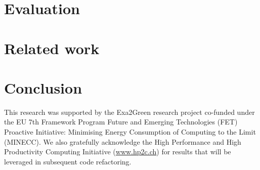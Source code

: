 \documentclass[twocolumn]{svjour3}
\DeclareRobustCommand\IPCClongname{}
\begin{document}
\section{Evaluation}
\label{sec:4}


\section{Related work}
\label{sec:5}


\section{Conclusion}
\label{sec:6}
\label{Sec6:Conclusions.tex}



\begin{acknowledgements}
This  research  was  supported   by  the  Exa2Green  research  project
co-funded  under the  EU  7th Framework  Program  Future and  Emerging
Technologies (FET) Proactive Initiative: Minimising Energy Consumption
of Computing  to the Limit  (MINECC).  We also  gratefully acknowledge
the  High  Performance  and  High  Productivity  Computing  Initiative
(\url{www.hp2c.ch}) for  results that will be  leveraged in subsequent
code refactoring.
\end{acknowledgements}

\DeclareRobustCommand\IPCClongname{ - Intergovernmental Panel on Climate Change}



\end{document}
